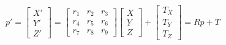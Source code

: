 \begin{equation}
    \label{eq:affine-model-representation}
    p' = 
    \begin{bmatrix}
        X' \\ Y' \\ Z'
    \end{bmatrix}
    =
    \begin{bmatrix}
        r_1 & r_2 & r_3 \\
        r_4 & r_5 & r_6 \\
        r_7 & r_8 & r_9 
    \end{bmatrix}
    \begin{bmatrix}
        X \\ Y \\ Z
    \end{bmatrix}
    +
    \begin{bmatrix}
        T_X \\ T_Y \\ T_Z
    \end{bmatrix}
    = Rp + T
\end{equation}